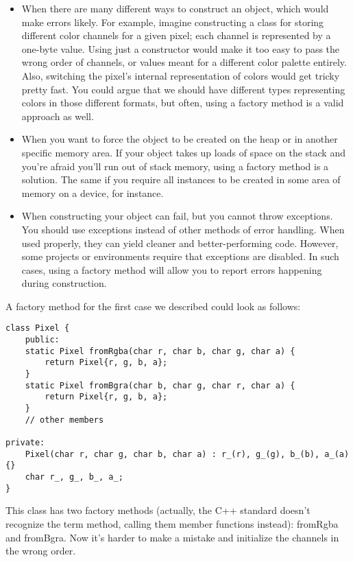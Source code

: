 \begin{itemize}
\item 
When there are many different ways to construct an object, which would make errors likely. For example, imagine constructing a class for storing different color channels for a given pixel; each channel is represented by a one-byte value. Using just a constructor would make it too easy to pass the wrong order of channels, or values meant for a different color palette entirely. Also, switching the pixel's internal representation of colors would get tricky pretty fast. You could argue that we should have different types representing colors in those different formats, but often, using a factory method is a valid approach as well.

\item 
When you want to force the object to be created on the heap or in another specific memory area. If your object takes up loads of space on the stack and you're afraid you'll run out of stack memory, using a factory method is a solution. The same if you require all instances to be created in some area of memory on a device, for instance.

\item 
When constructing your object can fail, but you cannot throw exceptions. You should use exceptions instead of other methods of error handling. When used properly, they can yield cleaner and better-performing code. However, some projects or environments require that exceptions are disabled. In such cases, using a factory method will allow you to report errors happening during construction.
\end{itemize}

A factory method for the first case we described could look as follows:

\begin{lstlisting}[style=styleCXX]
class Pixel {
	public:
	static Pixel fromRgba(char r, char b, char g, char a) {
		return Pixel{r, g, b, a};
	}
	static Pixel fromBgra(char b, char g, char r, char a) {
		return Pixel{r, g, b, a};
    }
	// other members
	
private:
	Pixel(char r, char g, char b, char a) : r_(r), g_(g), b_(b), a_(a) {}
	char r_, g_, b_, a_;
}
\end{lstlisting}

This class has two factory methods (actually, the C++ standard doesn't recognize the term method, calling them member functions instead): fromRgba and fromBgra. Now it's harder to make a mistake and initialize the channels in the wrong order.

